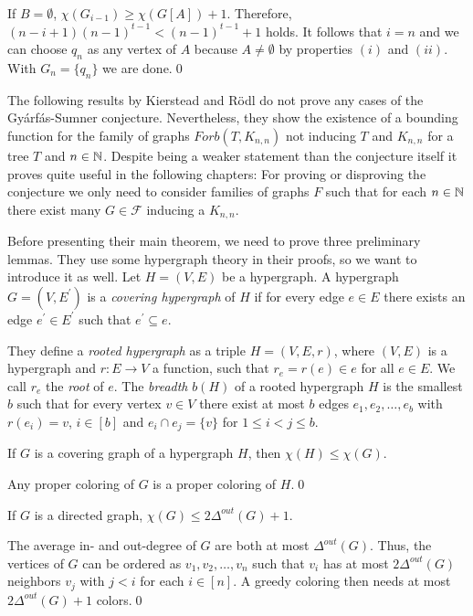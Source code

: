 \begin{prf}
If $B=\emptyset$, $\chi (G_{i-1})\geq \chi (G[A]) + 1$. Therefore, $(n-i+1)(n-1)^{t-1}<(n-1)^{t-1} +1$ holds. It follows that $i=n$ and we can choose $q_n$ as any vertex of $A$ because $A\neq\emptyset$ by properties $(i)$ and $(ii)$. With $G_n=\{q_n\}$ we are done.\qed
\end{prf}

The following results by Kierstead and Rödl \cite{Ki96} do not prove any cases of the Gyárfás-Sumner conjecture. Nevertheless, they show the existence of a bounding function for the family of graphs $\textit{Forb}(T,K_{n,n})$ not inducing $T$ and $K_{n,n}$ for a tree $T$ and $n\in\mathbb{N}$. Despite being a weaker statement than the conjecture itself it proves quite useful in the following chapters: For proving or disproving the conjecture we only need to consider families of graphs $F$ such that for each $n\in\mathbb{N}$ there exist many $G\in\mathcal{F}$ inducing a $K_{n,n}$.


Before presenting their main theorem, we need to prove three preliminary lemmas. They use some hypergraph theory in their proofs, so we want to introduce it as well. Let $H=(V,E)$ be a hypergraph. A hypergraph $G=(V,E^\prime)$ is a \textit{covering hypergraph} of $H$ if for every edge $e\in E$ there exists an edge $e^\prime\in E^\prime$ such that $e^\prime\subseteq e$. 

They define a \textit{rooted hypergraph} as a triple $H=(V,E,r)$, where $(V,E)$ is a hypergraph and $r:E\to V$ a function, such that $r_e=r(e)\in e$ for all $e\in E$. We call $r_e$ the \textit{root} of $e$. The \textit{breadth} $b(H)$ of a rooted hypergraph $H$ is the smallest $b$ such that for every vertex $v\in V$ there exist at most $b$ edges $e_1,e_2,\dots ,e_b$ with $r(e_i)=v$, $i\in [b]$ and $e_i\cap e_j= \{v\}$ for $1\leq i<j\leq b$.

\begin{lemma}\label{l1cr}
If $G$ is a covering graph of a hypergraph $H$, then $\chi (H)\leq\chi (G)$.
\end{lemma}
\begin{prf}
Any proper coloring of $G$ is a proper coloring of $H$.\qed
\end{prf}

\begin{lemma}\label{l2cr}
If $G$ is a directed graph, $\chi (G)\leq 2\Delta^{out}(G) +1$.
\end{lemma}
\begin{prf}
The average in- and out-degree of $G$ are both at most $\Delta^{out}(G)$. Thus, the vertices of $G$ can be ordered as $v_1,v_2,\dots ,v_n$  such that $v_i$ has at most $2\Delta^{out}(G)$ neighbors $v_j$ with $j <i$ for each $i\in [n]$. A greedy coloring then needs at most $2\Delta^{out}(G) +1$ colors.\qed
\end{prf}

